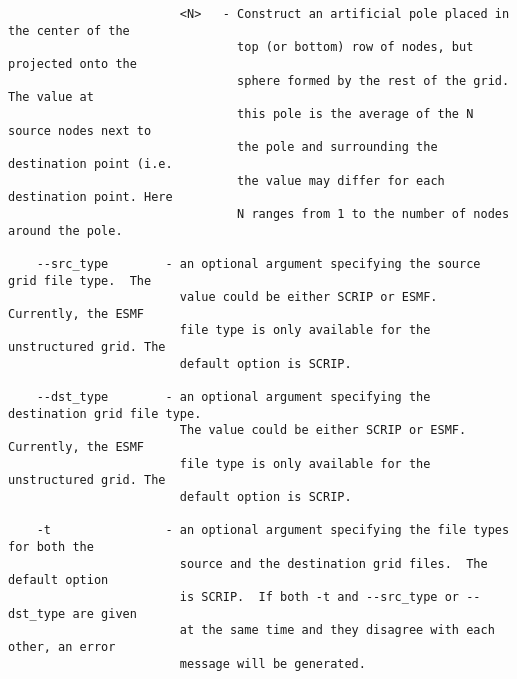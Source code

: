 \begin{verbatim}
                        <N>   - Construct an artificial pole placed in the center of the 
                                top (or bottom) row of nodes, but projected onto the
                                sphere formed by the rest of the grid. The value at
                                this pole is the average of the N source nodes next to
                                the pole and surrounding the destination point (i.e.
                                the value may differ for each destination point. Here 
                                N ranges from 1 to the number of nodes around the pole. 

    --src_type        - an optional argument specifying the source grid file type.  The 
                        value could be either SCRIP or ESMF.  Currently, the ESMF 
                        file type is only available for the unstructured grid. The 
                        default option is SCRIP.

    --dst_type        - an optional argument specifying the destination grid file type.  
                        The value could be either SCRIP or ESMF.  Currently, the ESMF 
                        file type is only available for the unstructured grid. The 
                        default option is SCRIP.

    -t                - an optional argument specifying the file types for both the 
                        source and the destination grid files.  The default option 
                        is SCRIP.  If both -t and --src_type or --dst_type are given
                        at the same time and they disagree with each other, an error
                        message will be generated.
\end{verbatim}

